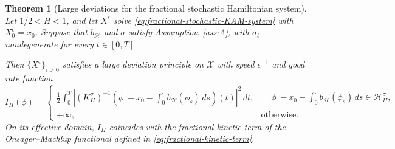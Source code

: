 \documentclass[preprint,12pt]{elsarticle}
\newtheorem{theorem}{Theorem}[section]
\theoremstyle{definition}
\theoremstyle{plain}
\begin{document}
\begin{theorem}[Large deviations for the fractional stochastic Hamiltonian system]
\label{cor:fractional-Hamiltonian-LDP}
Let $1/2<H<1$, and let $X^\epsilon$ solve
\eqref{eq:fractional-stochastic-KAM-system} with
$X_0^\epsilon=x_0$. Suppose that $b_{\mathscr H}$ and $\sigma$
satisfy Assumption~\ref{ass:A}, with $\sigma_t$ nondegenerate for
every $t\in[0,T]$.

Then $\{X^\epsilon\}_{\epsilon>0}$ satisfies a large deviation
principle on $\mathcal X$ with speed $\epsilon^{-1}$ and good rate
function
\begin{equation}
\label{eq:Hamiltonian-rate-function}
    I_H(\phi)
    =
    \begin{cases}
        \displaystyle
        \frac12
        \int_0^T
        \left|
            (K_H^\sigma)^{-1}
            \left(
                \phi_\cdot-x_0
                -
                \int_0^\cdot
                b_{\mathscr H}(\phi_s)\,ds
            \right)(t)
        \right|^2\,dt,
        &
        \begin{aligned}
        &\phi_\cdot-x_0
        -
        \displaystyle\int_0^\cdot
        b_{\mathscr H}(\phi_s)\,ds
        \in\mathcal H_H^\sigma,
        \end{aligned}
        \\[4ex]
        +\infty,
        &\text{otherwise}.
    \end{cases}
\end{equation}
On its effective domain, $I_H$ coincides with the fractional kinetic
term of the Onsager--Machlup functional defined in
\eqref{eq:fractional-kinetic-term}.
\end{theorem}
\end{document}
